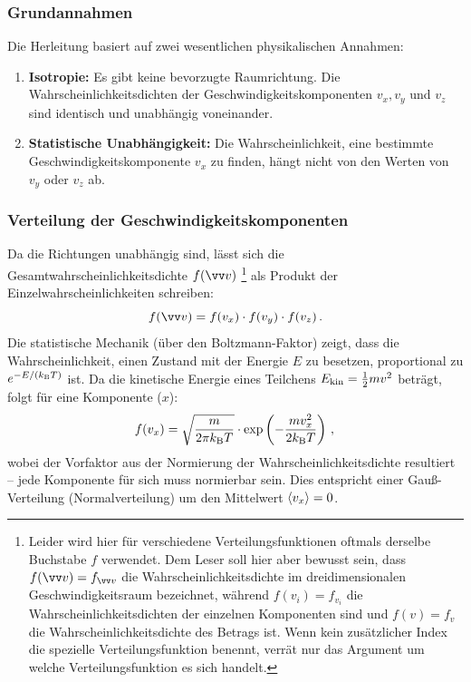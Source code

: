 \subsubsection{Grundannahmen}\label{subsubsec: mb_annahmen}
Die Herleitung basiert auf zwei wesentlichen physikalischen Annahmen:
\begin{enumerate}
    \item \textbf{Isotropie:} Es gibt keine bevorzugte Raumrichtung. Die Wahrscheinlichkeitsdichten der Geschwindigkeitskomponenten $v_x, v_y$ und $v_z$ sind identisch und unabhängig voneinander.
    \item \textbf{Statistische Unabhängigkeit:} 
    Die Wahrscheinlichkeit, eine bestimmte Geschwindigkeitskomponente $v_x$ zu finden, hängt nicht von den Werten von $v_y$ oder $v_z$ ab.
\end{enumerate}

\subsubsection{Verteilung der Geschwindigkeitskomponenten}\label{subsubsec: mb_komponenten}
Da die Richtungen unabhängig sind, lässt sich die Gesamtwahrscheinlichkeitsdichte $f(\ivec{v})$ \footnote{Leider wird hier für verschiedene Verteilungsfunktionen oftmals derselbe Buchstabe $f$ verwendet. Dem Leser soll hier aber bewusst sein, dass $f(\ivec{v}) = f_{\ivec{v}}$ die Wahrscheinlichkeitsdichte im dreidimensionalen Geschwindigkeitsraum bezeichnet, während $f(v_i) = f_{v_i}$ die Wahrscheinlichkeitsdichten der einzelnen Komponenten sind und $f(v) = f_v$ die Wahrscheinlichkeitsdichte des Betrags ist. Wenn kein zusätzlicher Index die spezielle Verteilungsfunktion benennt, verrät nur das Argument um welche Verteilungsfunktion es sich handelt.} als Produkt der Einzelwahrscheinlichkeiten schreiben:
\begin{equation}\label{eq: mb_produktansatz}
    f(\ivec{v}) = f(v_x) \cdot f(v_y) \cdot f(v_z) \mDot
\end{equation}
Die statistische Mechanik (über den Boltzmann-Faktor) zeigt, dass die Wahrscheinlichkeit, einen Zustand mit der Energie $E$ zu besetzen, proportional zu $e^{-E / (k_{\mathrm{B}} T)}$ ist. Da die kinetische Energie eines Teilchens $E_{\mathrm{kin}} = \frac{1}{2}m v^2$ beträgt, folgt für eine Komponente (\zB $x$):
\begin{equation}\label{eq: mb_komponente_gauss}
    f(v_x) = \sqrt{\frac{m}{2\pi k_{\mathrm{B}} T}} \cdot \exp\left( - \frac{m v_x^2}{2 k_{\mathrm{B}} T} \right) \,{,}\,
\end{equation}
wobei der Vorfaktor aus der Normierung der Wahrscheinlichkeitsdichte resultiert -- jede Komponente für sich muss normierbar sein. Dies entspricht einer Gauß-Verteilung (Normalverteilung) um den Mittelwert ${\langle{v_x}\rangle} = 0$.

